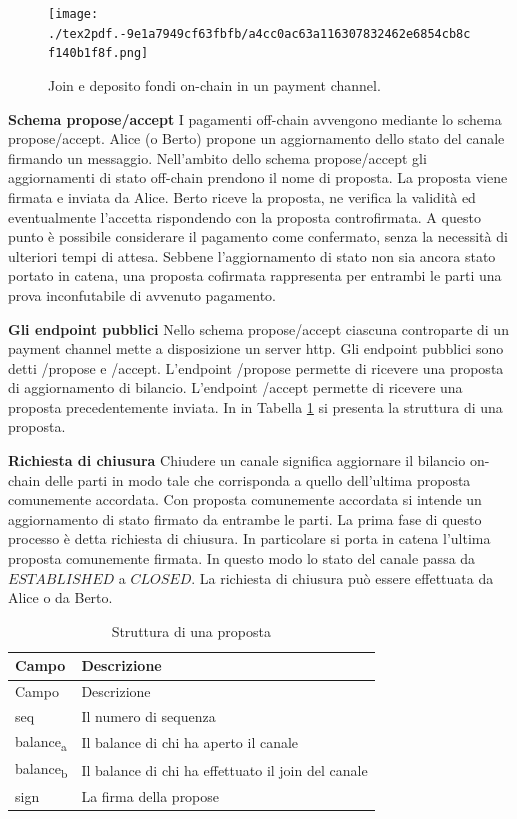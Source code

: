\documentclass[12pt,italian,]{book}
\begin{document}
\begin{figure}
\centering
\texttt{[image: ./tex2pdf.-9e1a7949cf63fbfb/a4cc0ac63a116307832462e6854cb8cf140b1f8f.png]}
\caption{Join e deposito fondi on-chain in un payment channel.}
\end{figure}

\textbf{\textbf{Schema propose/accept}} I pagamenti off-chain avvengono mediante lo schema propose/accept. Alice (o Berto) propone un aggiornamento dello stato del canale firmando un messaggio. Nell'ambito dello schema propose/accept gli aggiornamenti di stato off-chain prendono il nome di proposta. La proposta viene firmata e inviata da Alice. Berto riceve la proposta, ne verifica la validità ed eventualmente l'accetta rispondendo con la proposta controfirmata. A questo punto è possibile considerare il pagamento come confermato, senza la necessità di ulteriori tempi di attesa. Sebbene l'aggiornamento di stato non sia ancora stato portato in catena, una proposta cofirmata rappresenta per entrambi le parti una prova inconfutabile di avvenuto pagamento.

\textbf{\textbf{Gli endpoint pubblici}} Nello schema propose/accept ciascuna controparte di un payment channel mette a disposizione un server http. Gli endpoint pubblici sono detti /propose e /accept. L'endpoint /propose permette di ricevere una proposta di aggiornamento di bilancio. L'endpoint /accept permette di ricevere una proposta precedentemente inviata. In in Tabella \protect\hyperlink{struct_propose}{1} si presenta la struttura di una proposta.

\textbf{\textbf{Richiesta di chiusura}} Chiudere un canale significa aggiornare il bilancio on-chain delle parti in modo tale che corrisponda a quello dell'ultima proposta comunemente accordata. Con proposta comunemente accordata si intende un aggiornamento di stato firmato da entrambe le parti. La prima fase di questo processo è detta richiesta di chiusura. In particolare si porta in catena l'ultima proposta comunemente firmata. In questo modo lo stato del canale passa da \(ESTABLISHED\) a \(CLOSED\). La richiesta di chiusura può essere effettuata da Alice o da Berto.

\begin{longtable}[]{@{}ll@{}}
\caption{\protect\hypertarget{struct_propose}{}{}Struttura di una proposta}\tabularnewline
\toprule
Campo & Descrizione\tabularnewline
\midrule
\endfirsthead
\toprule
Campo & Descrizione\tabularnewline
\midrule
\endhead
seq & Il numero di sequenza\tabularnewline
balance\textsubscript{a} & Il balance di chi ha aperto il canale\tabularnewline
balance\textsubscript{b} & Il balance di chi ha effettuato il join del canale\tabularnewline
sign & La firma della propose\tabularnewline
\bottomrule
\end{longtable}
\end{document}
